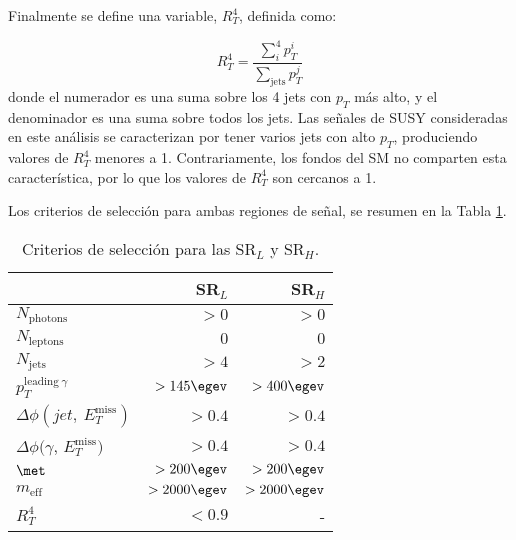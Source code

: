 Finalmente se define una variable, $R_{T}^{4}$, definida como:

\begin{equation}
R_{T}^{4}=\frac{\sum_{i}^{4}p_{T}^{i}}{\sum_{\text{jets}}p_{T}^{j}}
\end{equation}
donde el numerador es una suma sobre los 4 jets con $p_{T}$ más alto, y el denominador es una suma sobre todos los jets. Las señales de SUSY consideradas en este análisis se caracterizan por tener varios jets con alto $p_{T}$, produciendo valores de $R_{T}^{4}$ menores a 1. Contrariamente, los fondos del SM no comparten esta característica, por lo que los valores de $R_{T}^{4}$ son cercanos a 1.

Los criterios de selección para ambas regiones de señal, se resumen en la Tabla \ref{srs}.

\begin{table}
\centering
\caption{Criterios de selección para las SR$_{L}$ y SR$_{H}$.}
\begin{tabular}{ l | r | r }

	\hline

	& SR$_{L}$ & SR$_{H}$ \\

	\hline

	$N_{\text{photons}}$ 	& $> 0$ 	& $> 0$ \\

	$N_{\text{leptons}}$ 	& $0$ 	& $0$ \\

	$N_{\text{jets}}$ 	& $>4$ 	& $>2$ \\

	$p_{T}^{\text{leading}\: \gamma}$ 	& $> 145 \egev$ 	& $> 400 \egev$ \\

	$\Delta\phi(jet,\: E_{T}^{\text{miss}})$ 	& $> 0.4$ 	& $> 0.4$ \\

	$\Delta\phi(\gamma$,\: $E_{T}^{\text{miss}})$ 	& $>0.4$ 	& $>0.4$ \\

	$\met$ 	& $>200\egev$ 	& $>200\egev$ \\

	$m_{\text{eff}}$ 	& $> 2000 \egev$ 	& $> 2000 \egev$ \\

	$R_{T}^{4}$ 	& $< 0.9$ 	& - \\

	\hline


\end{tabular}
\label{srs}
\end{table}

